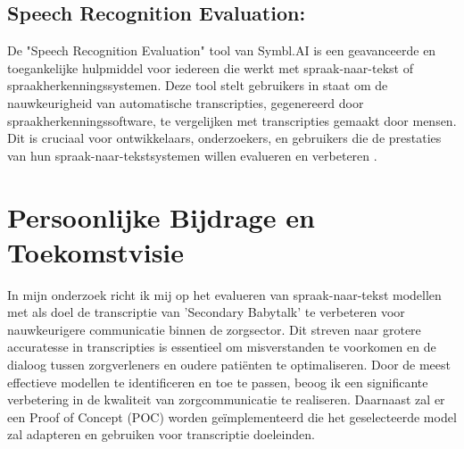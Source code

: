 \subsection{Speech Recognition Evaluation:} De "Speech Recognition Evaluation" tool van Symbl.AI is een geavanceerde en toegankelijke hulpmiddel voor iedereen die werkt met spraak-naar-tekst of spraakherkenningssystemen. Deze tool stelt gebruikers in staat om de nauwkeurigheid van automatische transcripties, gegenereerd door spraakherkenningssoftware, te vergelijken met transcripties gemaakt door mensen. Dit is cruciaal voor ontwikkelaars, onderzoekers, en gebruikers die de prestaties van hun spraak-naar-tekstsystemen willen evalueren en verbeteren \autocite{speechrecognitionevaluation2021}.

\section{Persoonlijke Bijdrage en Toekomstvisie}

In mijn onderzoek richt ik mij op het evalueren van spraak-naar-tekst modellen met als doel de transcriptie van 'Secondary Babytalk' te verbeteren voor nauwkeurigere communicatie binnen de zorgsector. Dit streven naar grotere accuratesse in transcripties is essentieel om misverstanden te voorkomen en de dialoog tussen zorgverleners en oudere patiënten te optimaliseren. Door de meest effectieve modellen te identificeren en toe te passen, beoog ik een significante verbetering in de kwaliteit van zorgcommunicatie te realiseren. Daarnaast zal er een Proof of Concept (POC) worden geïmplementeerd die het geselecteerde model zal adapteren en gebruiken voor transcriptie doeleinden.


